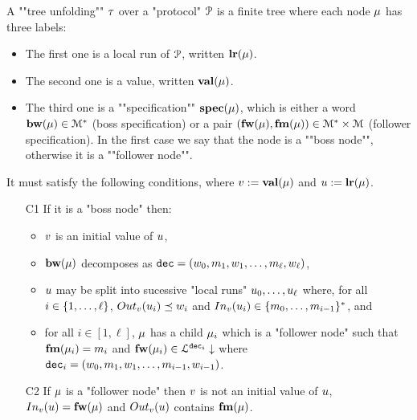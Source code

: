 \begin{definition}
	\label{def:tree-unfolding}
	A ""tree unfolding"" $\tau$ over a "protocol" $\mathcal{P}$ is
	a finite tree where each node $\mu$ has three labels:
	\begin{itemize}
		\item The first one is a local run of $\mathcal{P}$, written $\mathbf{lr}(\mu)$. 
		
		\item The second one is a value, written $\mathbf{val}(\mu)$.
		
		\item The third one is a ""specification"" $\mathbf{spec}(\mu)$, which is either a word $\mathbf{bw}(\mu) \in \mathcal{M}^*$ (boss specification) or a pair $(\mathbf{fw}(\mu), \mathbf{fm}(\mu)) \in \mathcal{M}^* \times \mathcal{M}$ (follower specification). In the first case we say that the node is a ""boss node"", otherwise it is a ""follower node"".
	\end{itemize} 
	
	It must satisfy the following conditions, where $v := \mathbf{val}(\mu)$ and $u := \mathbf{lr}(\mu)$.

	\begin{itemize}
		\item[C1\namedlabel{unfoldingC1}{C1}] If it is a "boss node" then:
		\begin{itemize} 
			\item $v$ is an initial value of $u$, 
			\item $\mathbf{bw}(\mu)$ decomposes as $\mathtt{dec} = (w_0, m_1, w_1, \ldots, m_{\ell}, w_{\ell})$, 
			\item $u$ may be split into sucessive "local runs" $u_0, \dots, u_{\ell}$ where, for all $i \in \{1,\dots,\ell\}$, $\voutput{\aval}{\localrun_i} \subword w_i$ and $\vinput{\aval}{\localrun_i} \in \set{m_0, \dots, m_{i-1}}^*$, and
			\item  for all $i \in [1,\ell]$, $\mu$ has a child $\mu_i$ which is a "follower node" such that $\mathbf{fm}(\mu_i) = m_i$ and $\mathbf{fw}(\mu_i) \in\mathcal{L}^{\mathtt{\mathtt{dec}_i}}\downarrow$ where $\mathtt{dec}_i = (w_0, m_1, w_1, \ldots, m_{i-1}, w_{i-1})$.
		\end{itemize}
		\item[C2\namedlabel{unfoldingC2}{C2}] If $\mu$ is a "follower node" then $v$ is not an initial value of $u$, $\vinput{\aval}{\localrun} = \followlabelword{\node}$ and 
		$\voutput{\aval}{\localrun}$ contains $\mathbf{fm}(\mu)$.
		

\end{itemize}
\end{definition}
